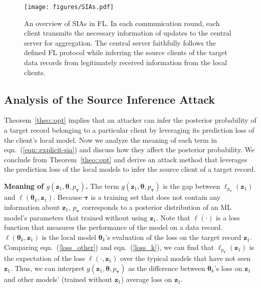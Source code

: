 \documentclass[10pt,journal,compsoc]{IEEEtran}
\begin{document}
\begin{figure*}
    \centering
    \texttt{[image: figures/SIAs.pdf]}
    \caption{{An overview of SIAs in FL. In each communication round, each client transmits the necessary information of updates to the central server for aggregation. The central server faithfully follows the defined FL protocol while inferring the source clients of the target data records from legitimately received information from the local clients.}}
    \label{fig::sia}
\end{figure*}

\subsection{Analysis of the Source Inference Attack}\label{sec::ana_sias}
Theorem~\ref{theo::opt} implies that an attacker can infer the posterior probability of a target record belonging to a particular client by leveraging its prediction loss of the client's local model. Now we analyze the meaning of each term in eqn.~(\ref{eqn::explicit-sia}) and discuss how they affect the posterior probability. We conclude from Theorem~\ref{theo::opt} and derive an attack method that leverages the prediction loss of the local models to infer the source client of a target record.

\noindent \textbf{Meaning of $g({\bm{z}_1},\bm{\theta} ,{p_{\bm{\tau}} })$. \;} The term $g({\bm{z}_1},\bm{\theta} ,{p_{\bm{\tau}} })$ is the gap between $\ell _{{p_{\bm{\tau}} }}({\bm{z}_1})$ and $\ell \left({\bm{\theta} _k},{\bm{z}_1}\right)$. Because $\bm{\tau}$ is a training set that does not contain any information about $\bm{z}_1$, $p_{\bm{\tau}}$ corresponds to a posterior distribution of an ML model's parameters that trained without using $\bm{z}_1$. Note that $\ell(\cdot)$ is a loss function that measures the performance of the model on a data record. $\ell \left({\bm{\theta} _k},{\bm{z}_1}\right)$ is the local model $\bm{\theta}_k$'s evaluation of the loss on the target record $\bm{z}_1$. Comparing eqn.~(\ref{loss_other}) and eqn.~(\ref{loss_k}), we can find that $\ell _{{p_{\bm{\tau}} }}({\bm{z}_1})$ is the expectation of the loss $\ell (\cdot,\bm{z}_1)$ over the typical models that have not seen $\bm{z}_1$. Thus, we can interpret $g({\bm{z}_1},\bm{\theta} ,{p_{\bm{\tau}} })$ as the difference between $\bm{\theta}_k$'s loss on $\bm{z}_1$ and other models' (trained without $\bm{z}_1$) average loss on $\bm{z}_1$. 
\end{document}
